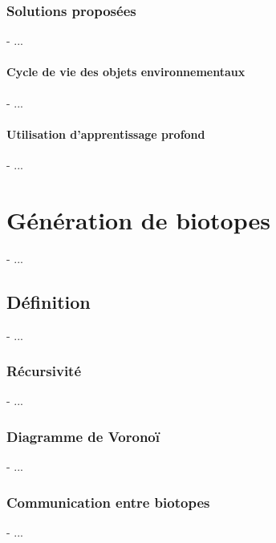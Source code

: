 \subsection{Solutions proposées}
- ...

\subsubsection{Cycle de vie des objets environnementaux}
- ...

\subsubsection{Utilisation d'apprentissage profond}
- ...


\chapter{Génération de biotopes}
\minitoc

- ...

\section{Définition}
- ...

\subsection{Récursivité}
- ...

\subsection{Diagramme de Voronoï}
- ...

\subsection{Communication entre biotopes}
- ...

